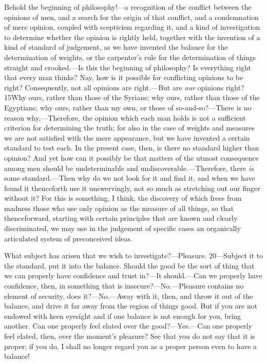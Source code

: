 Behold the beginning of philosophy!—a recognition of the conflict between the opinions of men, and a search for the origin of that conflict, and a condemnation of mere opinion, coupled with scepticism regarding it, and a kind of investigation to determine whether the opinion is rightly held, together with the invention of a kind of standard of judgement, as we have invented the balance for the determination of weights, or the carpenter's rule for the determination of things straight and crooked.—Is this the beginning of philosophy? Is everything right that every man thinks? Nay, how is it possible for conflicting opinions to be right? Consequently, not all opinions are right.—But are \emph{our} opinions right? 15Why ours, rather than those of the Syrians; why ours, rather than those of the Egyptians; why ours, rather than my own, or those of so-and-so?—There is no reason why.—Therefore, the opinion which each man holds is not a sufficient criterion for determining the truth; for also in the case of weights and measures we are not satisfied with the mere appearance, but we have invented a certain standard to test each. In the present case, then, is there no standard higher than opinion? And yet how can it possibly be that matters of the utmost consequence among men should be undeterminable and undiscoverable.—Therefore, there \emph{is} some standard.—Then why do we not look for it and find it, and when we have found it thenceforth use it unswervingly, not so much as stretching out our finger without it? For this is something, I think, the discovery of which frees from madness those who use only opinion as the measure of all things, so that thenceforward, starting with certain principles that are known and clearly discriminated, we may use in the judgement of specific cases an organically articulated system of preconceived ideas.

What subject has arisen that we wish to investigate?—Pleasure. 20—Subject it to the standard, put it into the balance. Should the good be the sort of thing that we can properly have confidence and trust in?—It should.—Can we properly have confidence, then, in something that is insecure?—No.—Pleasure contains no element of security, does it?—No.—Away with it, then, and throw it out of the balance, and drive it far away from the region of things good. But if you are not endowed with keen eyesight and if one balance is not enough for you, bring another. Can one properly feel elated over the good?—Yes.—Can one properly feel elated, then, over the moment's pleasure? See that you do not say that it is proper; if you do, I shall no longer regard you as a proper person even to have a balance!

